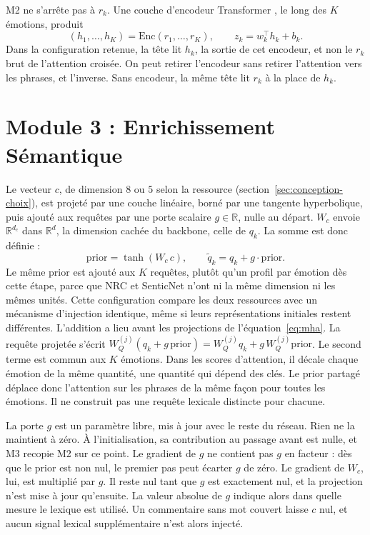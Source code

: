 M2 ne s'arrête pas à $r_k$. Une couche d'encodeur Transformer
\cite{vaswani2017}, le long des $K$ émotions, produit
\begin{equation}
(h_1,\dots,h_K) = \mathrm{Enc}(r_1,\dots,r_K),
\qquad z_k = w_k^\top h_k + b_k.
\label{eq:emo-enc}
\end{equation}
Dans la configuration retenue, la tête lit $h_k$, la sortie de cet
encodeur, et non le $r_k$ brut de l'attention croisée. On peut retirer
l'encodeur sans retirer l'attention vers les phrases, et l'inverse.
Sans encodeur, la même tête lit $r_k$ à la place de $h_k$.

\section{Module 3 : Enrichissement Sémantique}
\label{sec:conception-m3}

Le vecteur $c$, de dimension $8$ ou $5$ selon la ressource
(section~\ref{sec:conception-choix}), est projeté par une couche
linéaire, borné par une tangente hyperbolique, puis ajouté aux requêtes
par une porte scalaire $g \in \mathbb{R}$, nulle au départ. $W_c$ envoie
$\mathbb{R}^{d_c}$ dans $\mathbb{R}^{d}$, la dimension cachée du
backbone, celle de $q_k$. La somme est donc définie :
\begin{equation}
\mathrm{prior} = \tanh(W_c\, c), \qquad
\tilde{q}_k = q_k + g \cdot \mathrm{prior}.
\label{eq:gate}
\end{equation}
Le même $\mathrm{prior}$ est ajouté aux $K$ requêtes, plutôt qu'un
profil par émotion dès cette étape, parce que NRC et SenticNet n'ont ni
la même dimension ni les mêmes unités. Cette configuration compare les
deux ressources avec un mécanisme d'injection identique, même si leurs
représentations initiales restent différentes. L'addition a lieu avant
les projections de l'équation~\ref{eq:mha}. La requête projetée s'écrit
$W_Q^{(j)}(q_k + g\,\mathrm{prior}) = W_Q^{(j)} q_k + g\, W_Q^{(j)}\mathrm{prior}$.
Le second terme est commun aux $K$ émotions. Dans les scores d'attention,
il décale chaque émotion de la même quantité, une quantité qui dépend des
clés. Le prior partagé déplace donc l'attention sur les phrases de la
même façon pour toutes les émotions. Il ne construit pas une requête
lexicale distincte pour chacune.

La porte $g$ est un paramètre libre, mis à jour avec le reste du réseau.
Rien ne la maintient à zéro. À l'initialisation, sa contribution au
passage avant est nulle, et M3 recopie M2 sur ce point. Le gradient de
$g$ ne contient pas $g$ en facteur : dès que le prior est non nul, le
premier pas peut écarter $g$ de zéro. Le gradient de $W_c$, lui, est
multiplié par $g$. Il reste nul tant que $g$ est exactement nul, et la
projection n'est mise à jour qu'ensuite. La valeur absolue de $g$ indique
alors dans quelle mesure le lexique est utilisé. Un commentaire sans mot
couvert laisse $c$ nul, et aucun signal lexical supplémentaire n'est alors
injecté.

